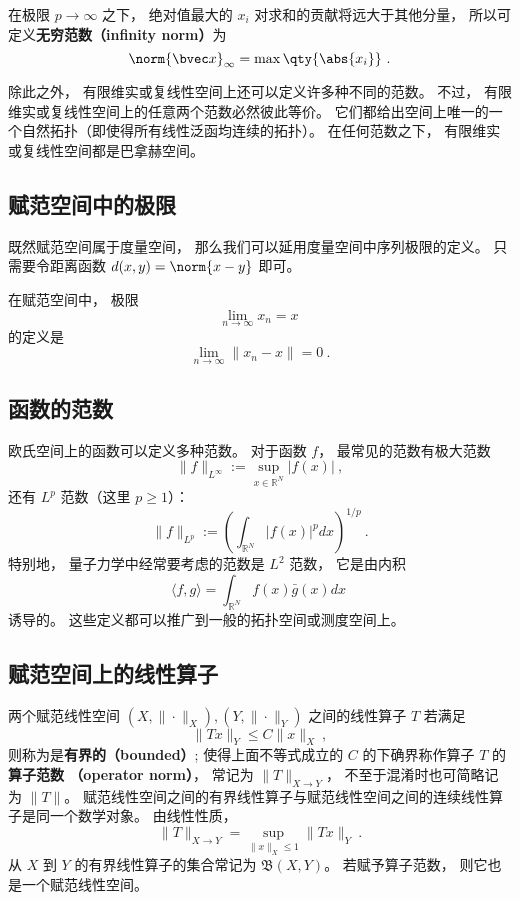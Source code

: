 在极限 $p \to \infty$ 之下， 绝对值最大的 $x_i$ 对求和的贡献将远大于其他分量， 所以可定义\textbf{无穷范数（infinity norm）}为
\begin{equation}
\norm{\bvec x}_\infty = \max \qty{\abs{x_i}}~.
\end{equation}

除此之外， 有限维实或复线性空间上还可以定义许多种不同的范数。 不过， 有限维实或复线性空间上的任意两个范数必然彼此等价。 它们都给出空间上唯一的一个自然拓扑（即使得所有线性泛函均连续的拓扑）。 在任何范数之下， 有限维实或复线性空间都是巴拿赫空间。

\subsection{赋范空间中的极限}
既然赋范空间属于度量空间， 那么我们可以延用度量空间中序列极限的定义。 只需要令距离函数 $d(x, y) = \norm{x - y}$ 即可。

在赋范空间中， 极限
\begin{equation}
\lim_{n\to\infty} x_n = x~
\end{equation}
的定义是
\begin{equation}
\lim_{n\to\infty} \|{x_n - x}\|= 0~.
\end{equation}

\subsection{函数的范数}
欧氏空间上的函数可以定义多种范数。 对于函数 $f$， 最常见的范数有极大范数
$$
\|f\|_{L^\infty}:=\sup_{x\in\mathbb{R}^N}|f(x)|~,
$$
还有 $L^p$ 范数（这里 $p\geq1$）：
$$
\|f\|_{L^p}:=\left(\int_{\mathbb{R}^N}|f(x)|^pdx\right)^{1/p}~.
$$
特别地， 量子力学中经常要考虑的范数是 $L^2$ 范数， 它是由内积
$$
\langle f,g\rangle=\int_{\mathbb{R}^N}f(x)\bar g(x)dx~
$$
诱导的。 这些定义都可以推广到一般的拓扑空间或测度空间上。

\subsection{赋范空间上的线性算子}
两个赋范线性空间 $(X,\|\cdot\|_X),(Y,\|\cdot\|_Y)$ 之间的线性算子 $T$ 若满足
$$
\|Tx\|_Y\leq C\|x\|_X~,
$$
则称为是\textbf{有界的（bounded）}; 使得上面不等式成立的 $C$ 的下确界称作算子 $T$ 的\textbf{算子范数 （operator norm）}， 常记为 $\|T\|_{X\to Y}$， 不至于混淆时也可简略记为 $\|T\|$。 赋范线性空间之间的有界线性算子与赋范线性空间之间的连续线性算子是同一个数学对象。 由线性性质，
$$
\|T\|_{X\to Y}=\sup_{\|x\|_X\leq 1}\|Tx\|_Y~.
$$
从 $X$ 到 $Y$ 的有界线性算子的集合常记为 $\mathfrak{B}(X,Y)$。 若赋予算子范数， 则它也是一个赋范线性空间。

